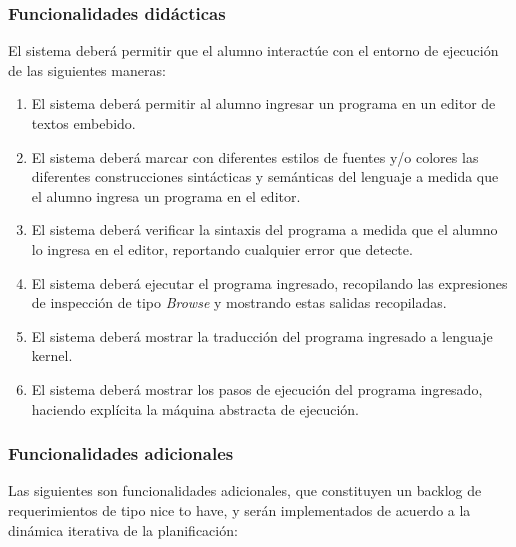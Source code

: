 \documentclass[a4paper,11pt]{article}
\begin{document}
\subsubsection{Funcionalidades didácticas}

El sistema deberá permitir que el alumno interactúe con el entorno de ejecución
de las siguientes maneras:

\begin{enumerate}

  \item El sistema deberá permitir al alumno ingresar un programa en un
    editor de textos embebido.

  \item El sistema deberá marcar con diferentes estilos de fuentes y/o
    colores las diferentes construcciones sintácticas y semánticas del
      lenguaje a medida que el alumno ingresa un programa en el editor.

    \item El sistema deberá verificar la sintaxis del programa a medida que el
      alumno lo ingresa en el editor, reportando cualquier error que detecte.

    \item El sistema deberá ejecutar el programa ingresado, recopilando las
      expresiones de inspección de tipo \textit{Browse} y mostrando estas
      salidas recopiladas.

    \item El sistema deberá mostrar la traducción del programa ingresado a
      lenguaje kernel.

    \item El sistema deberá mostrar los pasos de ejecución del programa
      ingresado, haciendo explícita la máquina abstracta de ejecución.

\end{enumerate}

\subsubsection{Funcionalidades adicionales}

Las siguientes son funcionalidades adicionales, que constituyen un backlog de
requerimientos de tipo nice to have, y serán implementados de acuerdo a la
dinámica iterativa de la planificación:
\end{document}
